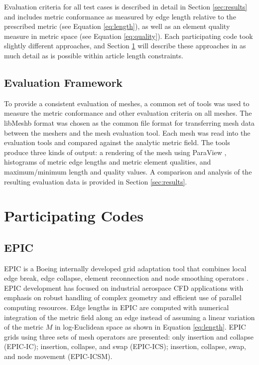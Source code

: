 \documentclass[3p,times,procedia,number]{elsarticle}
\begin{document}
Evaluation criteria for all test cases is described in detail in Section \ref{sec:results} and includes metric conformance
as measured by edge length relative to the prescribed metric (see Equation \ref{eq:length}),
as well as an element quality measure in metric space (see Equation \ref{eq:quality}).
Each participating code took slightly different approaches, and Section \ref{sec:codes} will
describe these approaches in as much detail as is possible within article length constraints.

\subsection{Evaluation Framework}

To provide a consistent evaluation of meshes, a common set of tools was used to measure the metric conformance and other evaluation criteria on all meshes.
The libMeshb \cite{libMeshb-website} format was chosen as the common file format for transferring mesh data between the meshers and the mesh evaluation tool.
Each mesh was read into the evaluation tools and compared against the analytic metric field.
The tools produce three kinds of output: a rendering of the mesh using ParaView \cite{paraview-book},
histograms of metric edge lengths and metric element qualities, and maximum/minimum length
and quality values.
A comparison and analysis of the resulting evaluation data is provided in Section \ref{sec:results}.

\section{Participating Codes}
\label{sec:codes}

\subsection{EPIC}

EPIC is a Boeing internally developed grid adaptation tool that combines
local edge break, edge collapse, element reconnection and node smoothing
operators \cite{michal-krakos-aniso-adapt-edge}.
EPIC development has focused on industrial aerospace CFD
applications with emphasis on robust handling of complex geometry and
efficient use of parallel computing resources. Edge lengths in EPIC are
computed with numerical integration of the metric field along an edge
instead of assuming a linear variation of the metric $M$ in log-Euclidean space
as shown in Equation \ref{eq:length}.
EPIC grids using three sets of mesh operators are presented:
only insertion and collapse (EPIC-IC); insertion, collapse, and swap (EPIC-ICS);
insertion, collapse, swap, and node movement (EPIC-ICSM).
\end{document}
